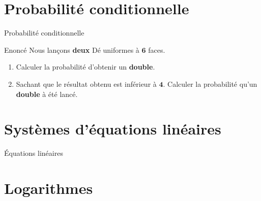 \documentclass{beamer}
\begin{document}
\section{Probabilité conditionnelle}%
\label{sec:probabilite_conditionnelle}

\begin{frame}[t]{Probabilité conditionnelle}
  
  \begin{block}{Enoncé}
    Nous lançons \textbf{deux} Dé uniformes à $\mathbf{6}$ faces. 
  \end{block}

  \begin{block}{}
    \begin{enumerate}
      \item Calculer  la probabilité d'obtenir un \alert{\textbf{double}}.
      \item Sachant que le résultat obtenu est \alert{inférieur} à
        $\mathbf{4}$. Calculer la probabilité qu'un \textbf{double}  à
        été lancé.
    \end{enumerate}
  \end{block}
\end{frame}


\section{Systèmes d'équations linéaires}%
\label{sec:systemes_d_equations_lineaires}

\begin{frame}[t]{Équations linéaires}
  

\end{frame}


\section{Logarithmes}%
\label{sec:logarithmes}
\end{document}
